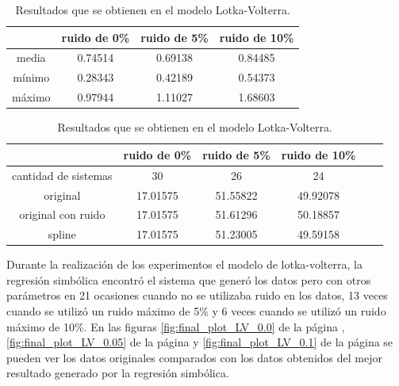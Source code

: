 \begin{table}[!h]
    \centering
    \caption{Resultados que se obtienen en el modelo Lotka-Volterra.}

    \begin{tabular}{|c|c|c|c|}
        \hline
               & \textbf{ruido de 0\%} & \textbf{ruido de 5\%} & \textbf{ruido de 10\%} \\
        \hline
        media  & 0.74514               & 0.69138               & 0.84485                \\
        \hline
        mínimo & 0.28343               & 0.42189               & 0.54373                \\
        \hline
        máximo & 0.97944               & 1.11027               & 1.68603                \\
        \hline
    \end{tabular}

    \begin{tabular}{|c|c|c|c|c|c|}
        \hline
                             & \textbf{ruido de 0\%} & \textbf{ruido de 5\%} & \textbf{ruido de 10\%} \\
        \hline
        cantidad de sistemas & 30                    & 26                    & 24                     \\
        \hline
        original             & 17.01575              & 51.55822              & 49.92078               \\
        \hline
        original con ruido   & 17.01575              & 51.61296              & 50.18857               \\
        \hline
        spline               & 17.01575              & 51.23005              & 49.59158               \\
        \hline
    \end{tabular}

    \label{table:experiment_lotka_volterra}
\end{table}

Durante la realización de los experimentos el modelo de lotka-volterra, la regresión simbólica encontró el sistema que generó los datos pero con otros parámetros en 21 ocasiones cuando no se utilizaba ruido en los datos, 13 veces cuando se utilizó un ruido máximo de 5\% y 6 veces cuando se utilizó un ruido máximo de 10\%. En las figuras \ref{fig:final_plot_LV_0.0} de la página \pageref{fig:final_plot_LV_0.0}, \ref{fig:final_plot_LV_0.05} de la página \pageref{fig:final_plot_LV_0.05} y \ref{fig:final_plot_LV_0.1} de la página \pageref{fig:final_plot_LV_0.1} se pueden ver los datos originales comparados con los datos obtenidos del mejor resultado generado por la regresión simbólica.

